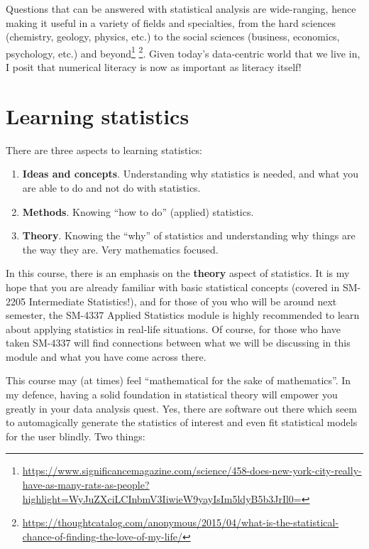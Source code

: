 \documentclass[
]{book}
\theoremstyle{definition}
\theoremstyle{definition}
\theoremstyle{definition}
\theoremstyle{definition}
\theoremstyle{remark}
\begin{document}
Questions that can be answered with statistical analysis are wide-ranging, hence making it useful in a variety of fields and specialties, from the hard sciences (chemistry, geology, physics, etc.) to the social sciences (business, economics, psychology, etc.) and beyond\footnote{\url{https://www.significancemagazine.com/science/458-does-new-york-city-really-have-as-many-rats-as-people?highlight=WyJuZXciLCInbmV3IiwieW9yayIsIm5ldyB5b3JrIl0=}} \footnote{\url{https://thoughtcatalog.com/anonymous/2015/04/what-is-the-statistical-chance-of-finding-the-love-of-my-life/}}.
Given today's data-centric world that we live in, I posit that numerical literacy is now as important as literacy itself!

\hypertarget{learning-statistics}{%
\section*{Learning statistics}\label{learning-statistics}}

There are three aspects to learning statistics:

\begin{enumerate}
\def\labelenumi{\arabic{enumi}.}
\item
  \textbf{Ideas and concepts}. Understanding why statistics is needed, and what you are able to do and not do with statistics.
\item
  \textbf{Methods}. Knowing ``how to do'' (applied) statistics.
\item
  \textbf{Theory}. Knowing the ``why'' of statistics and understanding why things are the way they are. Very mathematics focused.
\end{enumerate}

In this course, there is an emphasis on the \textbf{theory} aspect of statistics. It is my hope that you are already familiar with basic statistical concepts (covered in SM-2205 Intermediate Statistics!), and for those of you who will be around next semester, the SM-4337 Applied Statistics module is highly recommended to learn about applying statistics in real-life situations. Of course, for those who have taken SM-4337 will find connections between what we will be discussing in this module and what you have come across there.

This course may (at times) feel ``mathematical for the sake of mathematics''. In my defence, having a solid foundation in statistical theory will empower you greatly in your data analysis quest. Yes, there are software out there which seem to automagically generate the statistics of interest and even fit statistical models for the user blindly. Two things:
\end{document}
